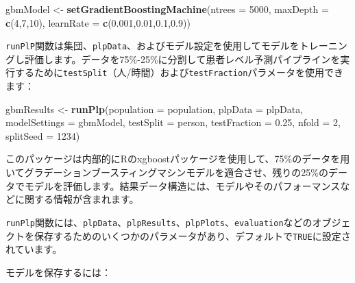 \documentclass[
  11pt]{book}
\newenvironment{Shaded}{\begin{snugshade}}{\end{snugshade}}
\newcommand{\AttributeTok}[1]{\textcolor[rgb]{0.13,0.29,0.53}{#1}}
\newcommand{\DecValTok}[1]{\textcolor[rgb]{0.00,0.00,0.81}{#1}}
\newcommand{\FloatTok}[1]{\textcolor[rgb]{0.00,0.00,0.81}{#1}}
\newcommand{\FunctionTok}[1]{\textcolor[rgb]{0.13,0.29,0.53}{\textbf{#1}}}
\newcommand{\NormalTok}[1]{#1}
\newcommand{\OtherTok}[1]{\textcolor[rgb]{0.56,0.35,0.01}{#1}}
\newcommand{\SpecialCharTok}[1]{\textcolor[rgb]{0.81,0.36,0.00}{\textbf{#1}}}
\newcommand{\StringTok}[1]{\textcolor[rgb]{0.31,0.60,0.02}{#1}}
\theoremstyle{definition}
\theoremstyle{definition}
\theoremstyle{definition}
\theoremstyle{definition}
\theoremstyle{remark}
\begin{document}
\begin{Shaded}
\begin{Highlighting}[]
\NormalTok{gbmModel }\OtherTok{\textless{}{-}} \FunctionTok{setGradientBoostingMachine}\NormalTok{(}\AttributeTok{ntrees =} \DecValTok{5000}\NormalTok{,}
                                       \AttributeTok{maxDepth =} \FunctionTok{c}\NormalTok{(}\DecValTok{4}\NormalTok{,}\DecValTok{7}\NormalTok{,}\DecValTok{10}\NormalTok{),}
                                       \AttributeTok{learnRate =} \FunctionTok{c}\NormalTok{(}\FloatTok{0.001}\NormalTok{,}\FloatTok{0.01}\NormalTok{,}\FloatTok{0.1}\NormalTok{,}\FloatTok{0.9}\NormalTok{))}
\end{Highlighting}
\end{Shaded}

\texttt{runPlP}関数は集団、\texttt{plpData}、およびモデル設定を使用してモデルをトレーニングし評価します。データを75\%-25\%に分割して患者レベル予測パイプラインを実行するために\texttt{testSplit}（人/時間）および\texttt{testFraction}パラメータを使用できます：

\begin{Shaded}
\begin{Highlighting}[]
\NormalTok{gbmResults }\OtherTok{\textless{}{-}} \FunctionTok{runPlp}\NormalTok{(}\AttributeTok{population =}\NormalTok{ population,}
                     \AttributeTok{plpData =}\NormalTok{ plpData,}
                     \AttributeTok{modelSettings =}\NormalTok{ gbmModel,}
                     \AttributeTok{testSplit =} \StringTok{\textquotesingle{}person\textquotesingle{}}\NormalTok{,}
                     \AttributeTok{testFraction =} \FloatTok{0.25}\NormalTok{,}
                     \AttributeTok{nfold =} \DecValTok{2}\NormalTok{,}
                     \AttributeTok{splitSeed =} \DecValTok{1234}\NormalTok{)}
\end{Highlighting}
\end{Shaded}

このパッケージは内部的にRのxgboostパッケージを使用して、75\%のデータを用いてグラデーションブースティングマシンモデルを適合させ、残りの25\%のデータでモデルを評価します。結果データ構造には、モデルやそのパフォーマンスなどに関する情報が含まれます。

\texttt{runPlp}関数には、\texttt{plpData}、\texttt{plpResults}、\texttt{plpPlots}、\texttt{evaluation}などのオブジェクトを保存するためのいくつかのパラメータがあり、デフォルトで\texttt{TRUE}に設定されています。

モデルを保存するには：

\begin{Shaded}
\end{Shaded}
\end{document}
